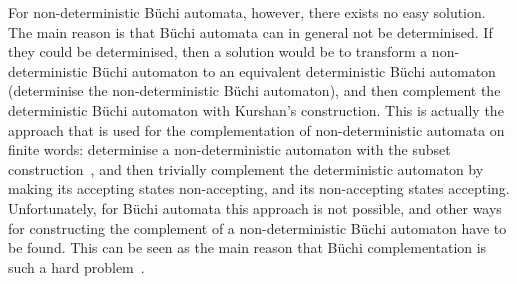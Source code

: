For non-deterministic Büchi automata, however, there exists no easy solution. The main reason is that Büchi automata can in general not be determinised. If they could be determinised, then a solution would be to transform a non-deterministic Büchi automaton to an equivalent deterministic Büchi automaton (determinise the non-deterministic Büchi automaton), and then complement the deterministic Büchi automaton with Kurshan's construction. This is actually the approach that is used for the complementation of non-deterministic automata on finite words: determinise a non-deterministic automaton with the subset construction~\cite{1959_rabin}, and then trivially complement the deterministic automaton by making its accepting states non-accepting, and its non-accepting states accepting. Unfortunately, for Büchi automata this approach is not possible, and other ways for constructing the complement of a non-deterministic Büchi automaton have to be found. This can be seen as the main reason that Büchi complementation is such a hard problem~\cite{niessner1997deterministic}.




